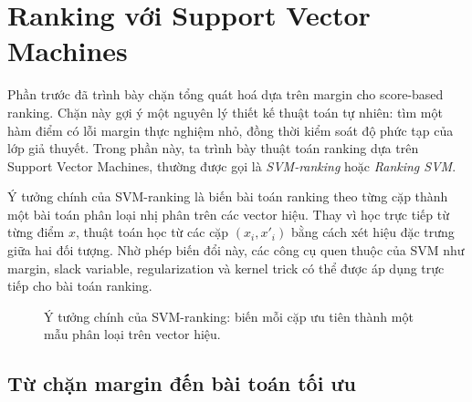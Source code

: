 \section{Ranking với Support Vector Machines}
\label{sec:ranking-with-svm}

Phần trước đã trình bày chặn tổng quát hoá dựa trên margin cho score-based ranking. Chặn này gợi ý một nguyên lý thiết kế thuật toán tự nhiên: tìm một hàm điểm có lỗi margin thực nghiệm nhỏ, đồng thời kiểm soát độ phức tạp của lớp giả thuyết. Trong phần này, ta trình bày thuật toán ranking dựa trên Support Vector Machines, thường được gọi là \textit{SVM-ranking} hoặc \textit{Ranking SVM}.

Ý tưởng chính của SVM-ranking là biến bài toán ranking theo từng cặp thành một bài toán phân loại nhị phân trên các vector hiệu. Thay vì học trực tiếp từ từng điểm \(x\), thuật toán học từ các cặp \((x_i,x'_i)\) bằng cách xét hiệu đặc trưng giữa hai đối tượng. Nhờ phép biến đổi này, các công cụ quen thuộc của SVM như margin, slack variable, regularization và kernel trick có thể được áp dụng trực tiếp cho bài toán ranking.

\begin{figure}[H]
    \centering
    \caption{Ý tưởng chính của SVM-ranking: biến mỗi cặp ưu tiên thành một mẫu phân loại trên vector hiệu.}
    \label{fig:section4-svm-ranking-pipeline}
\end{figure}

\subsection{Từ chặn margin đến bài toán tối ưu}

